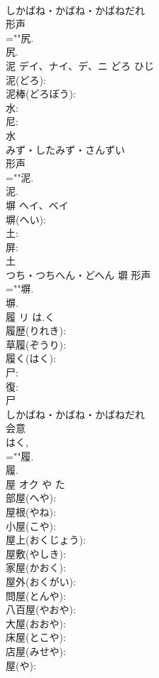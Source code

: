 \documentclass[8pt]{extreport}
\begin{document}
\begin{CJK}{UTF8}{min}
\\	しかばね・かばね・かばねだれ	
\\	形声 
\\	=""尻.
\\	尻.
\\	泥	デイ、ナイ、デ、ニ	どろ	ひじ	
\\	泥(どろ): 
\\	泥棒(どろぼう): 
\\	水: 
\\	尼: 
\\	水	
\\	みず・したみず・さんずい	
\\	形声 
\\	=""泥.
\\	泥.
\\	塀	ヘイ、ベイ			
\\	塀(へい): 
\\	土: 
\\	屏: 
\\	土	
\\	つち・つちへん・どへん	塀	形声 
\\	=""塀.
\\	塀.
\\	履	リ	は.く		
\\	履歴(りれき): 
\\	草履(ぞうり): 
\\	履く(はく): 
\\	尸: 
\\	復: 
\\	尸	
\\	しかばね・かばね・かばねだれ	
\\	会意 
\\	はく, 
\\	=""履.
\\	履.
\\	屋	オク	や	た	
\\	部屋(へや): 
\\	屋根(やね): 
\\	小屋(こや): 
\\	屋上(おくじょう): 
\\	屋敷(やしき): 
\\	家屋(かおく): 
\\	屋外(おくがい): 
\\	問屋(とんや): 
\\	八百屋(やおや): 
\\	大屋(おおや): 
\\	床屋(とこや): 
\\	店屋(みせや): 
\\	屋(や): 

\end{CJK}
\end{document}
